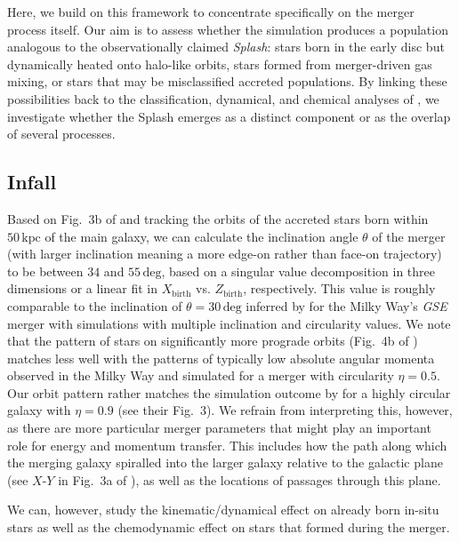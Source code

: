 \documentclass[fleqn,usenatbib]{mnras}
\begin{document}
Here, we build on this framework to concentrate specifically on the merger process itself. Our aim is to assess whether the simulation produces a population analogous to the observationally claimed \textit{Splash}: stars born in the early disc but dynamically heated onto halo-like orbits, stars formed from merger-driven gas mixing, or stars that may be misclassified accreted populations. By linking these possibilities back to the classification, dynamical, and chemical analyses of , we investigate whether the Splash emerges as a distinct component or as the overlap of several processes.

\subsection{Infall}

Based on Fig.~3b of  and tracking the orbits of the accreted stars born within $50\,\mathrm{kpc}$ of the main galaxy, we can calculate the inclination angle $\theta$ of the merger (with larger inclination meaning a more edge-on rather than face-on trajectory) to be between $34$ and $55\,\mathrm{deg}$, based on a singular value decomposition in three dimensions or a linear fit in $X_\mathrm{birth}$ vs. $Z_\mathrm{birth}$, respectively. This value is roughly comparable to the inclination of $\theta = 30\,\mathrm{deg}$ inferred by \citet{Naidu2021} for the Milky Way's \textit{GSE} merger with simulations with multiple inclination and circularity values. We note that the pattern of stars on significantly more prograde orbits (Fig.~4b of ) matches less well with the patterns of typically low absolute angular momenta observed in the Milky Way and simulated for a merger with circularity $\eta = 0.5$. Our orbit pattern rather matches the simulation outcome by \citet{Naidu2021} for a highly circular galaxy with $\eta = 0.9$ (see their Fig.~3). We refrain from interpreting this, however, as there are more particular merger parameters that might play an important role for energy and momentum transfer. This includes how the path along which the merging galaxy spiralled into the larger galaxy relative to the galactic plane (see $X$-$Y$ in Fig.~3a of ), as well as the locations of passages through this plane.

We can, however, study the kinematic/dynamical effect on already born in-situ stars as well as the chemodynamic effect on stars that formed during the merger.
\end{document}
